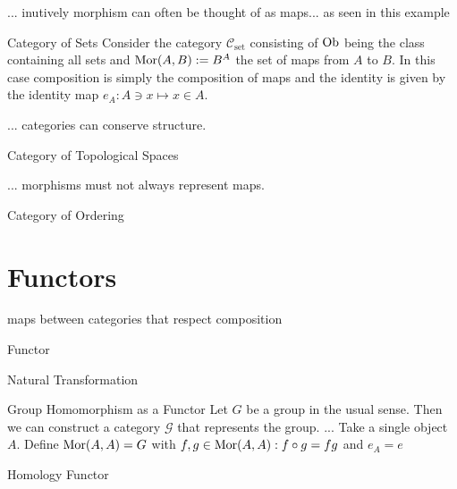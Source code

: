 ... inutively morphism can often be thought of as maps...
as seen in this example

\begin{example}{Category of Sets}{}
Consider the category $\mathcal{C}_\mathrm{set}$ consisting of $\mathrm {Ob}$ being the class containing all sets and $\mathrm {Mor}(A,B) := B^A$ the set of maps from $A$ to $B$. In this case composition is simply the composition of maps and the identity is given by the identity map $e_A: A \ni x \mapsto x \in A$.
\end{example}

... categories can conserve structure.

\begin{example}{Category of Topological Spaces}{}
\end{example}

... morphisms must not always represent maps.

\begin{example}{Category of Ordering}{}
\end{example}

\section{Functors}
maps between categories that respect composition

\begin{definition}{Functor}{}
\end{definition}

\begin{example}{Natural Transformation}{}
\source
\end{example}

\begin{example}{Group Homomorphism as a Functor \todo}{}
Let $G$ be a group in the usual sense. Then we can construct a category $\mathcal{G}$ that represents the group. ... Take a single object $A$. Define $\mathrm {Mor}(A,A) =  G$ with $f,g \in \mathrm {Mor}(A,A): f\circ g = fg$ and $e_A = e$
\end{example}

\begin{example}{Homology Functor}{}
\end{example}